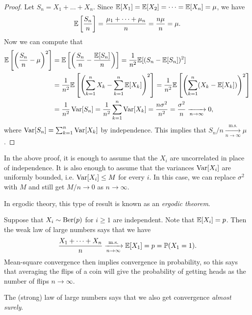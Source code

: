 \begin{proof}
  Let $S_n = X_1 + \dots + X_n$.
  Since $\mathbb{E}[X_1] = \mathbb{E}[X_2] = \dots = \mathbb{E}[X_n] = \mu$,
  we have
  \[
    \mathbb{E}\left[\frac{S_n}{n}\right]
    = \frac{\mu_1 + \dots + \mu_n}{n} = \frac{n\mu}{n}
    = \mu.
  \]
  Now we can compute that
  \begin{align*}
    \mathbb{E}\left[\left(\frac{S_n}{n} - \mu\right)^2\right]
    &= \mathbb{E}\left[\left(\frac{S_n}{n} - \frac{\mathbb{E}[S_n]}{n}\right)\right]
    = \frac{1}{n^2} \mathbb{E}[(S_n - \mathbb{E}[S_n])^2] \\
    &= \frac{1}{n^2} \mathbb{E}\left[\left(\sum_{k = 1}^n X_k - \sum_{k = 1}^n \mathbb{E}[X_k]\right)^2\right]
    = \frac{1}{n^2} \mathbb{E}\left[\left(\sum_{k = 1}^n (X_k - \mathbb{E}[X_k])\right)^2\right] \\
    &= \frac{1}{n^2} \operatorname{Var}[S_n]
    = \frac{1}{n^2} \sum_{k = 1}^n \operatorname{Var}[X_k]
    = \frac{n\sigma^2}{n^2} = \frac{\sigma^2}{n}
    \xrightarrow[n \to \infty]{} 0,
  \end{align*}
  where $\operatorname{Var}[S_n] = \sum_{k = 1}^n \operatorname{Var}[X_k]$ by independence.
  This implies that $S_n / n \xrightarrow[n \to \infty]{\mathrm{m.s.}} \mu$.
\end{proof}

\begin{remark}
  In the above proof, it is enough to assume that the
  $X_i$ are uncorrelated in place of independence.
  It is also enough to assume that the variances
  $\operatorname{Var}[X_i]$ are uniformly bounded, i.e.
  $\operatorname{Var}[X_i] \le M$ for every $i$. In this case,
  we can replace $\sigma^2$ with $M$ and still get
  $M / n \to 0$ as $n \to \infty$.
\end{remark}

\begin{remark}
  In ergodic theory, this type of result is known
  as an \emph{ergodic theorem}.
\end{remark}

\begin{example}
  Suppose that $X_i \sim \operatorname{Ber}(p)$ for $i \ge 1$
  are independent. Note that $\mathbb{E}[X_i] = p$.
  Then the weak law of large numbers says that
  we have
  \[
    \frac{X_1 + \dots + X_n}{n} \xrightarrow[n \to \infty]{\mathrm{m.s.}} \mathbb{E}[X_1] = p = \mathbb{P}(X_1 = 1).
  \]
  Mean-square convergence then implies
  convergence in probability, so
  this says that averaging the flips of a coin
  will give the probability of getting heads
  as the number of flips $n \to \infty$.
\end{example}

\begin{remark}
  The (strong) law of large numbers says that
  we also get convergence \emph{almost surely}.
\end{remark}

